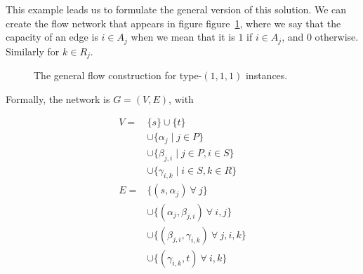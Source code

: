 This example leads us to formulate the general version of this solution. We can create the flow network that appears in figure figure~\ref{fig:generalflow111}, where we say that the capacity of an edge is $i \in A_j$ when we mean that it is $1$ if $i \in A_j$, and $0$ otherwise. Similarly for $k \in R_j$.



\begin{figure}
\caption{The general flow construction for type-$(1, 1, 1)$ instances.}
\label{fig:generalflow111}
\end{figure}

Formally, the network is $G = (V, E)$, with

\begin{align*}
V = &\{s\} \cup \{t\}\\
&\cup \{\alpha_j \mid j \in P\}\\
&\cup \{\beta_{j, i} \mid j \in P, i \in S\}\\
&\cup \{\gamma_{i, k} \mid i \in S, k \in R\}\\
E = &\{(s, \alpha_j)\ \forall\ j\}\\
    &\cup \{(\alpha_j, \beta_{j, i})\ \forall\ i, j \}\\
    &\cup \{(\beta_{j, i}, \gamma_{i, k})\ \forall\ j, i, k\}\\
    &\cup \{(\gamma_{i, k}, t)\ \forall\ i, k \}
\end{align*}

